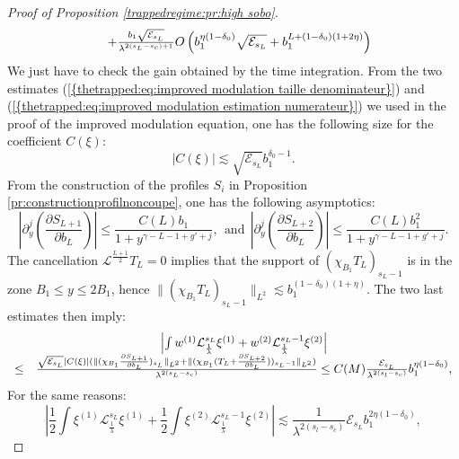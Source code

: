 \documentclass[11pt,a4paper,reqno]{amsart}
\theoremstyle{remark}
\numberwithin{equation}{section}
\begin{document}
\begin{proof}[Proof of Proposition \ref{trappedregime:pr:high sobo}]
\begin{equation}
\begin{array}{r c l}
&+\frac{b_1\sqrt{\mathcal{E}_{s_L}}}{\lambda^{2(s_L-s_c)+1}}O\left(b_1^{\eta(1-\delta_0)} \sqrt{\mathcal{E}_{s_L}}+b_1^{L+(1-\delta_0)(1+2\eta)}  \right)
\end{array}
\end{equation}
We just have to check the gain obtained by the time integration. From the two estimates {{\rm (\ref{{thetrapped:eq:improved modulation taille denominateur}})}} and {{\rm (\ref{{thetrapped:eq:improved modulation estimation numerateur}})}} we used in the proof of the improved modulation equation, one has the following size for the coefficient $C(\xi)$:
\begin{equation} \label{thetrapped:highsobo:estimation C(xi)}
|C(\xi)|\lesssim \sqrt{\mathcal{E}_{s_L}}b_1^{\delta_0-1}.
\end{equation}
From the construction of the profiles $S_i$ in Proposition \ref{pr:constructionprofilnoncoupe}, one has the following asymptotics:
\begin{equation} \label{thetrapped:highsobo:asymptotic SL+1 SL+2}
\left| \partial_y^j \left( \frac{\partial S_{L+1}}{\partial b_L}\right) \right|\leq  \frac{C(L)b_1}{1+y^{\gamma-L-1+g'+j}}, \ \ \text{and} \ \ \left| \partial_y^j \left( \frac{\partial S_{L+2}}{\partial b_L}\right) \right|\leq \frac{C(L)b_1^2}{1+y^{\gamma-L-1+g'+j}}.
\end{equation}
The cancellation $\mathcal{L}^{\frac{L+1}{2}}T_L=0$ implies that the support of $(\chi_{B_1}T_L)_{s_L-1}$ is in the zone $B_1\leq y \leq 2B_1$, hence $\parallel (\chi_{B_1}T_L)_{s_L-1} \parallel_{L^2}\lesssim b_1^{(1-\delta_0)(1+\eta)}$. The two last estimates then imply:
\begin{equation} \label{thetrapped:eq:gain inte dernier term mod}
\begin{array}{r c l}
&\left|  \int w^{(1)}\mathcal{L}_{\frac{1}{\lambda}}^{s_L} \xi^{(1)}  +  w^{(2)}\mathcal{L}_{\frac{1}{\lambda}}^{s_L-1} \xi^{(2)} \right| \\
\leq& \frac{\sqrt{\mathcal{E}_{s_L}}|C(\xi)| (\parallel (\chi_{B_1}\frac{\partial S_{L+1}}{\partial b_L})_{s_L} \parallel_{L^2} +\parallel (\chi_{B_1}(T_L+\frac{\partial S_{L+2}}{\partial b_L}))_{s_L-1} \parallel_{L^2} )}{\lambda^{2(s_L-s_c)}}  \leq C(M)\frac{\mathcal{E}_{s_L}}{\lambda^{2(s_l-s_c)}} b_1^{\eta(1-\delta_0)} ,
\end{array}
\end{equation}
For the same reasons:
\begin{equation} \label{thetrapped:eq:gain inte dernier term mod 2}
\left| \frac{1}{2}\int \xi^{(1)}\mathcal{L}_{\frac{1}{\lambda}}^{s_L} \xi^{(1)} +\frac{1}{2} \int \xi^{(2)} \mathcal{L}_{\frac{1}{\lambda}}^{s_L-1} \xi^{(2)}   \right| \lesssim \frac{1}{\lambda^{2(s_l-s_c)}} \mathcal{E}_{s_L}b_1^{2\eta(1-\delta_0)} ,

\end{equation}
\end{proof}
\end{document}
